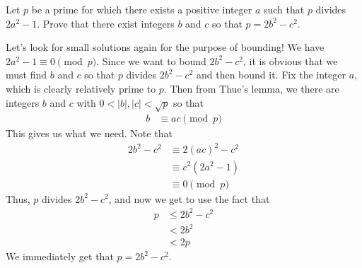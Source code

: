 \documentclass{subfile}
\begin{document}
	\begin{problem}
		Let $p$ be a prime for which there exists a positive integer $a$ such that $p$ divides $2a^2-1$. Prove that there exist integers $b$ and $c$ so that $p=2b^2-c^2$.
	\end{problem}

	\begin{solution}
		Let's look for small solutions again for the purpose of bounding! We have $2a^2-1\equiv0\pmod p$. Since we want to bound $2b^2-c^2$, it is obvious that we must find $b$ and $c$ so that $p$ divides $2b^2-c^2$ and then bound it. Fix the integer $a$, which is clearly relatively prime to $p$. Then from Thue's lemma, we there are integers $b$ and $c$ with $0<|b|,|c|<\sqrt{p}$ so that
		\begin{align*}
			b & \equiv ac\pmod p
		\end{align*}
		This gives us what we need. Note that
		\begin{align*}
			2b^2-c^2 & \equiv 2(ac)^2-c^2\\
			& \equiv c^2(2a^2-1)\\
			& \equiv 0\pmod p
		\end{align*}
		Thus, $p$ divides $2b^2-c^2$, and now we get to use the fact that
		\begin{align*}
			p & \leq 2b^2-c^2\\
			& < 2b^2 \\
			& < 2p
		\end{align*}
		We immediately get that $p=2b^2-c^2$.
	\end{solution}
\end{document}
